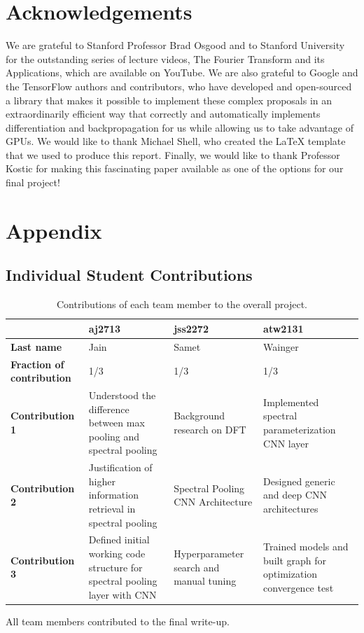 \documentclass[10pt,journal,compsoc]{IEEEtran}
\begin{document}
\section{Acknowledgements}

We are grateful to Stanford Professor Brad Osgood and to Stanford University for the outstanding series of lecture videos, The Fourier Transform and its Applications, which are available on YouTube. We are also grateful to Google and the TensorFlow authors and contributors, who have developed and open-sourced a library that makes it possible to implement these complex proposals in an extraordinarily efficient way that correctly and automatically implements differentiation and backpropagation for us while allowing us to take advantage of GPUs. We would like to thank Michael Shell, who created the LaTeX template that we used to produce this report. Finally, we would like to thank Professor Kostic for making this fascinating paper available as one of the options for our final project!





\section{Appendix}

\subsection{Individual Student Contributions}

\begin{table}[h!]
  \begin{center}
    \caption{Contributions of each team member to the overall project.}
    \label{tab:contributions}
    \begin{tabular}{p{2cm}|p{2cm}|p{2cm}|p{2cm}}
      & \textbf{aj2713} & \textbf{jss2272} & \textbf{atw2131}\\
      \hline
      \textbf{Last name} & Jain & Samet & Wainger \\
      \hline
      \textbf{Fraction of contribution} & 1/3 & 1/3 & 1/3\\
      \hline
      \textbf{Contribution 1} & Understood the difference between max pooling and spectral pooling & Background research on DFT & Implemented spectral parameterization CNN layer\\
      \hline
      \textbf{Contribution 2} & Justification of higher information retrieval in spectral pooling & Spectral Pooling CNN Architecture & Designed generic and deep CNN architectures\\
      \hline
      \textbf{Contribution 3} & Defined initial working code structure for spectral pooling layer with CNN  & Hyperparameter search and manual tuning & Trained models and built graph for optimization convergence test\\
    \end{tabular}
  \end{center}
\end{table}

All team members contributed to the final write-up.
\end{document}
